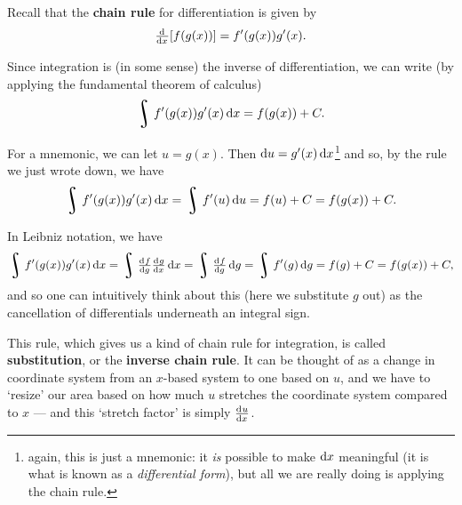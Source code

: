 


Recall that the \textbf{chain rule} for differentiation is given by
\begin{displaymath}
  \od{}{x} [f(g(x))] = f'(g(x)) g'(x).
\end{displaymath}

Since integration is (in some sense) the inverse of differentiation, we can write (by applying the fundamental theorem of calculus)
\begin{displaymath}
  \rint f'(g(x)) g'(x) \dif{x} = f(g(x)) + C.
\end{displaymath}

For a mnemonic, we can let $ u = g(x) $. Then $ \dif{u} = g'(x) \dif{x} $\footnote{again, this is just a mnemonic: it \emph{is} possible to
make $ \dif{x} $ meaningful (it is what is known as a \emph{differential form}), but all we are really doing is applying the chain rule.}
and so, by the rule we just wrote down, we have
\begin{displaymath}
  \rint f'(g(x)) g'(x) \dif{x} = \rint f'(u) \dif{u} = f(u) + C = f(g(x)) + C.
\end{displaymath}

In Leibniz notation, we have
\begin{displaymath}
  \rint f'(g(x)) g'(x) \dif{x} = \rint \od{f}{g} \od{g}{x} \dif{x} = \rint \od{f}{g} \dif{g} = \rint f'(g) \dif{g} = f(g) + C = f(g(x)) + C,
\end{displaymath}
and so one can intuitively think about this (here we substitute $ g $ out) as the cancellation of differentials underneath an integral sign.

This rule, which gives us a kind of chain rule for integration, is called \textbf{substitution}, or the \textbf{inverse chain rule}. It
can be thought of as a change in coordinate system from an $ x$-based system to one based on $ u $, and we have to `resize' our area based
on how much $ u $ stretches the coordinate system compared to $ x $ --- and this `stretch factor' is simply $ \od{u}{x} $.

